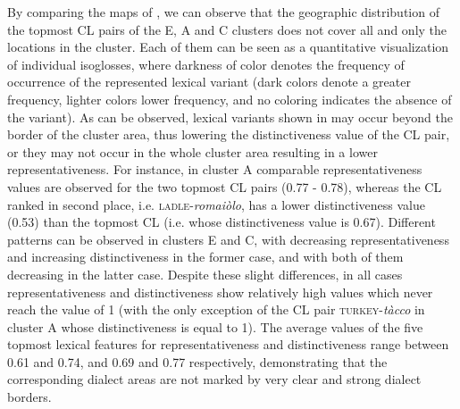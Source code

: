 \documentclass[output=paper]{LSP/langsci}
\begin{document}
By comparing the maps of , we can observe that the geographic distribution of the topmost CL pairs of the E, A and C clusters does not cover all and only the locations in the cluster. Each of them can be seen as a quantitative visualization of individual isoglosses, where darkness of color denotes the frequency of occurrence of the represented lexical variant (dark colors denote a greater frequency, lighter colors lower frequency, and no coloring indicates the absence of the variant). As can be observed, lexical variants shown in  may occur beyond the border of the cluster area, thus lowering the distinctiveness value of the CL pair, or they may not occur in the whole cluster area resulting in a lower representativeness. For instance, in cluster A comparable representativeness values are observed for the two topmost CL pairs (0.77 - 0.78), whereas the CL ranked in second place, i.e. \textsc{ladle}{}-\textit{romaiòlo}, has a lower distinctiveness value (0.53) than the topmost CL (i.e. whose distinctiveness value is 0.67). Different patterns can be observed in clusters E and C, with decreasing representativeness and increasing distinctiveness in the former case, and with both of them decreasing in the latter case. Despite these slight differences, in all cases representativeness and distinctiveness show relatively high values which never reach the value of 1 (with the only exception of the CL pair \textsc{turkey}{}-\textit{tàcco} in cluster A whose distinctiveness is equal to 1). The average values of the five topmost lexical features for representativeness and distinctiveness range between 0.61 and 0.74, and 0.69 and 0.77 respectively, demonstrating that the corresponding dialect areas are not marked by very clear and strong dialect borders. 
\end{document}
